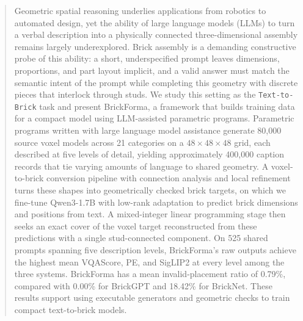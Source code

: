 \begin{abstract}
Geometric spatial reasoning underlies applications from robotics to automated design, yet the ability of large language models (LLMs) to turn a verbal description into a physically connected three-dimensional assembly remains largely underexplored. Brick assembly is a demanding constructive probe of this ability: a short, underspecified prompt leaves dimensions, proportions, and part layout implicit, and a valid answer must match the semantic intent of the prompt while completing this geometry with discrete pieces that interlock through studs. We study this setting as the \texttt{Text-to-Brick} task and present BrickForma, a framework that builds training data for a compact model using LLM-assisted parametric programs. Parametric programs written with large language model assistance generate 80,000 source voxel models across 21 categories on a $48\times48\times48$ grid, each described at five levels of detail, yielding approximately 400,000 caption records that tie varying amounts of language to shared geometry. A voxel-to-brick conversion pipeline with connection analysis and local refinement turns these shapes into geometrically checked brick targets, on which we fine-tune Qwen3-1.7B with low-rank adaptation to predict brick dimensions and positions from text. A mixed-integer linear programming stage then seeks an exact cover of the voxel target reconstructed from these predictions with a single stud-connected component. On 525 shared prompts spanning five description levels, BrickForma's raw outputs achieve the highest mean VQAScore, PE, and SigLIP2 at every level among the three systems. BrickForma has a mean invalid-placement ratio of 0.79\%, compared with 0.00\% for BrickGPT and 18.42\% for BrickNet. These results support using executable generators and geometric checks to train compact text-to-brick models.
\end{abstract}